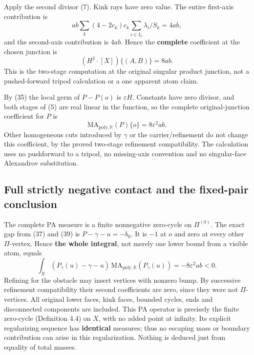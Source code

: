 \documentclass[
  11pt,
]{article}
\begin{document}
Apply the second divisor (7). Kink rays have zero value. The entire
first-axis contribution is \[
 ab\sum_k(4-2c_k)c_k\sum_{i\in I_k}\lambda_i/S_k=4ab,
\] and the second-axis contribution is \(4ab\). Hence the
\textbf{complete} coefficient at the chosen junction is \[
                          (H^2\cdot[X])\{(A,B)\}=8ab.              \tag{46}
\] This is the two-stage computation at the original singular product
junction, not a pushed-forward tripod calculation or a one apparent atom
claim.

By (35) the local germ of \(P-P(o)\) is \(\varepsilon H\). Constants
have zero divisor, and both stages of (5) are real linear in the
function, so the complete original-junction coefficient for \(P\) is \[
                    \mathrm{MA}_{\mathrm{poly},\mathbb{R}}(P)\{o\}
                                  =8\varepsilon^2ab.          \tag{47}
\] Other homogeneous cuts introduced by \(\gamma\) or the
carrier/refinement do not change this coefficient, by the proved
two-stage refinement compatibility. The calculation uses no pushforward
to a tripod, no missing-axis convention and no singular-face Alexandrov
substitution.

\subsection{Full strictly negative contact and the fixed-pair
conclusion}\label{full-strictly-negative-contact-and-the-fixed-pair-conclusion}

The complete PA measure is a finite nonnegative zero-cycle on
\(\Pi^{(0)}\). The exact gap from (37) and (39) is \(P-\gamma-u=-b_0\).
It is \(-1\) at \(o\) and zero at every other \(\Pi\)-vertex. Hence
\textbf{the whole integral}, not merely one lower bound from a visible
atom, equals \[
\int_X(P_\gamma(u)-\gamma-u)\,
        \mathrm{MA}_{\mathrm{poly},\mathbb{R}}(P_\gamma(u))
                       =-8\varepsilon^2ab<0.                  \tag{48}
\] Refining for the obstacle may insert vertices with nonzero bump. By
successive refinement compatibility their second coefficients are zero,
since they were not \(\Pi\)-vertices. All original lower faces, kink
faces, bounded cycles, ends and disconnected components are included.
This PA operator is precisely the finite zero-cycle (Definition 4.4) on
\(X\), with no added point at infinity. Its explicit regularizing
sequence has \textbf{identical} measures; thus no escaping mass or
boundary contribution can arise in this regularization. Nothing is
deduced just from equality of total masses.
\end{document}
